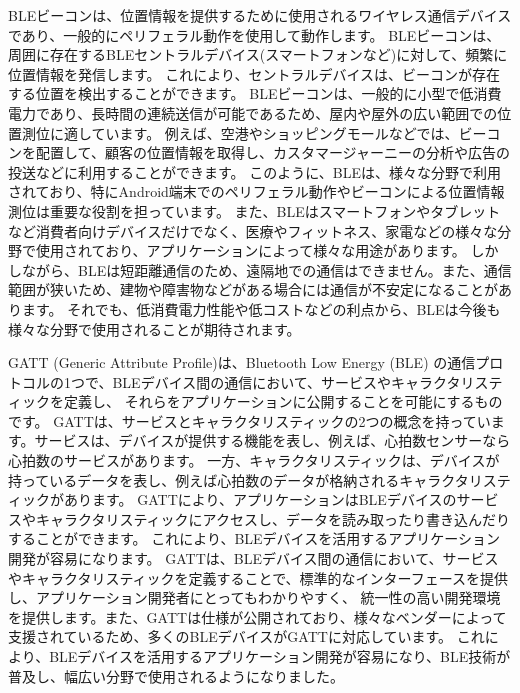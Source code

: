 BLEビーコンは、位置情報を提供するために使用されるワイヤレス通信デバイスであり、一般的にペリフェラル動作を使用して動作します。
BLEビーコンは、周囲に存在するBLEセントラルデバイス(スマートフォンなど)に対して、頻繁に位置情報を発信します。
これにより、セントラルデバイスは、ビーコンが存在する位置を検出することができます。
BLEビーコンは、一般的に小型で低消費電力であり、長時間の連続送信が可能であるため、屋内や屋外の広い範囲での位置測位に適しています。
例えば、空港やショッピングモールなどでは、ビーコンを配置して、顧客の位置情報を取得し、カスタマージャーニーの分析や広告の投送などに利用することができます。
このように、BLEは、様々な分野で利用されており、特にAndroid端末でのペリフェラル動作やビーコンによる位置情報測位は重要な役割を担っています。
また、BLEはスマートフォンやタブレットなど消費者向けデバイスだけでなく、医療やフィットネス、家電などの様々な分野で使用されており、アプリケーションによって様々な用途があります。
しかしながら、BLEは短距離通信のため、遠隔地での通信はできません。また、通信範囲が狭いため、建物や障害物などがある場合には通信が不安定になることがあります。
それでも、低消費電力性能や低コストなどの利点から、BLEは今後も様々な分野で使用されることが期待されます。



GATT (Generic Attribute Profile)は、Bluetooth Low Energy (BLE) の通信プロトコルの1つで、BLEデバイス間の通信において、サービスやキャラクタリスティックを定義し、
それらをアプリケーションに公開することを可能にするものです。
GATTは、サービスとキャラクタリスティックの2つの概念を持っています。サービスは、デバイスが提供する機能を表し、例えば、心拍数センサーなら心拍数のサービスがあります。
一方、キャラクタリスティックは、デバイスが持っているデータを表し、例えば心拍数のデータが格納されるキャラクタリスティックがあります。
GATTにより、アプリケーションはBLEデバイスのサービスやキャラクタリスティックにアクセスし、データを読み取ったり書き込んだりすることができます。
これにより、BLEデバイスを活用するアプリケーション開発が容易になります。
GATTは、BLEデバイス間の通信において、サービスやキャラクタリスティックを定義することで、標準的なインターフェースを提供し、アプリケーション開発者にとってもわかりやすく、
統一性の高い開発環境を提供します。また、GATTは仕様が公開されており、様々なベンダーによって支援されているため、多くのBLEデバイスがGATTに対応しています。
これにより、BLEデバイスを活用するアプリケーション開発が容易になり、BLE技術が普及し、幅広い分野で使用されるようになりました。



